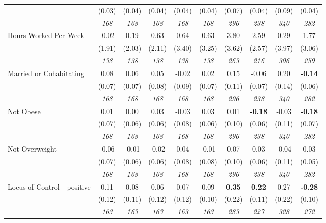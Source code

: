 \begin{tabular}{l c c c c c c c c c}
& (0.03) & (0.04) & (0.04) & (0.04) & (0.04) & (0.07) & (0.04) & (0.09) & (0.04) \\
& \textit{ 168 } & \textit{ 168 } & \textit{ 168 } & \textit{ 168 } & \textit{ 168 } & \textit{ 296 } & \textit{ 238 } & \textit{ 340 } & \textit{ 282 } \\
Hours Worked Per Week & -0.02 & 0.19 & 0.63 & 0.64 & 0.63 & 3.80 & 2.59 & 0.29 & 1.77 \\
& (1.91) & (2.03) & (2.11) & (3.40) & (3.25) & (3.62) & (2.57) & (3.97) & (3.06) \\
& \textit{ 138 } & \textit{ 138 } & \textit{ 138 } & \textit{ 138 } & \textit{ 138 } & \textit{ 263 } & \textit{ 216 } & \textit{ 306 } & \textit{ 259 } \\
Married or Cohabitating & 0.08 & 0.06 & 0.05 & -0.02 & 0.02 & 0.15 & -0.06 & 0.20 & \textbf{-0.14} \\
& (0.07) & (0.07) & (0.08) & (0.09) & (0.07) & (0.11) & (0.07) & (0.14) & (0.06) \\
& \textit{ 168 } & \textit{ 168 } & \textit{ 168 } & \textit{ 168 } & \textit{ 168 } & \textit{ 296 } & \textit{ 238 } & \textit{ 340 } & \textit{ 282 } \\
Not Obese & 0.01 & 0.00 & 0.03 & -0.03 & 0.03 & 0.01 & \textbf{-0.18} & -0.03 & \textbf{-0.18} \\
& (0.07) & (0.06) & (0.06) & (0.08) & (0.06) & (0.10) & (0.06) & (0.11) & (0.07) \\
& \textit{ 168 } & \textit{ 168 } & \textit{ 168 } & \textit{ 168 } & \textit{ 168 } & \textit{ 296 } & \textit{ 238 } & \textit{ 340 } & \textit{ 282 } \\
Not Overweight & -0.06 & -0.01 & -0.02 & 0.04 & -0.01 & 0.07 & 0.03 & -0.04 & 0.03 \\
& (0.07) & (0.06) & (0.06) & (0.08) & (0.08) & (0.10) & (0.06) & (0.11) & (0.05) \\
& \textit{ 168 } & \textit{ 168 } & \textit{ 168 } & \textit{ 168 } & \textit{ 168 } & \textit{ 296 } & \textit{ 238 } & \textit{ 340 } & \textit{ 282 } \\
Locus of Control - positive & 0.11 & 0.08 & 0.06 & 0.07 & 0.09 & \textbf{ 0.35 } & \textbf{0.22} & 0.27 & \textbf{-0.28} \\
& (0.12) & (0.11) & (0.12) & (0.12) & (0.10) & (0.22) & (0.11) & (0.22) & (0.10) \\
& \textit{ 163 } & \textit{ 163 } & \textit{ 163 } & \textit{ 163 } & \textit{ 163 } & \textit{ 283 } & \textit{ 227 } & \textit{ 328 } & \textit{ 272 } \\

\end{tabular}
